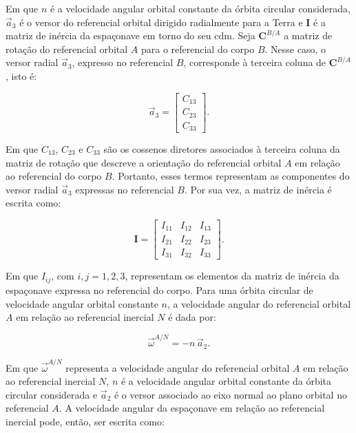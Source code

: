 Em que $n$ é a velocidade angular orbital constante da órbita circular considerada, $\vec{a}_3$ é o versor do referencial orbital dirigido radialmente para a Terra e $\mathbf{I}$ é a matriz de inércia da espaçonave em torno do seu \gls{cdm}.
Seja $\mathbf{C}^{B/A}$ a matriz de rotação do referencial orbital $A$ para o referencial do corpo $B$. Nesse caso, o versor radial $\vec a_3$, expresso no referencial $B$, corresponde à terceira coluna de $\mathbf{C}^{B/A}$, isto é:

\begin{equation}
\vec a_3 =
\begin{bmatrix}
C_{13}\\
C_{23}\\
C_{33}
\end{bmatrix}.
\label{eq_a3_corpo}
\end{equation}

Em que $C_{13}$, $C_{23}$ e $C_{33}$ são os cossenos diretores associados à terceira coluna da matriz de rotação que descreve a orientação do referencial orbital $A$ em relação ao referencial do corpo $B$. Portanto, esses termos representam as componentes do versor radial $\vec a_3$ expressas no referencial $B$.
Por sua vez, a matriz de inércia é escrita como:

\begin{equation}
\mathbf{I}=
\begin{bmatrix}
I_{11} & I_{12} & I_{13}\\
I_{21} & I_{22} & I_{23}\\
I_{31} & I_{32} & I_{33}
\end{bmatrix}.
\label{eq_inercia_expandida_corpo}
\end{equation}

Em que $I_{ij}$, com $i,j=1,2,3$, representam os elementos da matriz de inércia da espaçonave expressa no referencial do corpo.
Para uma órbita circular de velocidade angular orbital constante $n$, a velocidade angular do referencial orbital $A$ em relação ao referencial inercial $N$ é dada por:

\begin{equation}
\vec{\omega}^{A/N} = -n\,\vec{a}_2.
\label{eq_omega_A_N}
\end{equation}

Em que $\vec{\omega}^{A/N}$ representa a velocidade angular do referencial orbital $A$ em relação ao referencial inercial $N$, $n$ é a velocidade angular orbital constante da órbita circular considerada e $\vec{a}_2$ é o versor associado ao eixo normal ao plano orbital no referencial $A$.
A velocidade angular da espaçonave em relação ao referencial inercial pode, então, ser escrita como:

